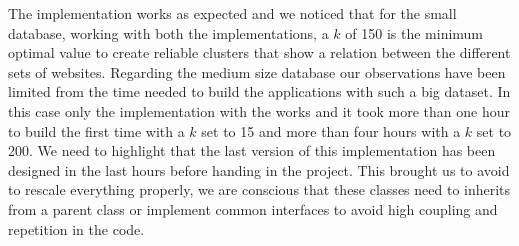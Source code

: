 The implementation works as expected and we noticed that for the small database, working with both the implementations, a $k$ of 150 is the minimum optimal value to create reliable clusters that show a relation between the different sets of websites. Regarding the medium size database our observations have been limited from the time needed to build the applications with such a big dataset. In this case only the implementation with the  works and it took more than one hour to build the first time with a $k$ set to 15 and more than four hours with a $k$ set to 200.
We need to highlight that the last version of this implementation has been designed in the last hours before handing in the project. This brought us to avoid to rescale everything properly, we are conscious that these classes need to inherits from a parent class or implement common interfaces to avoid high coupling and repetition in the code.
